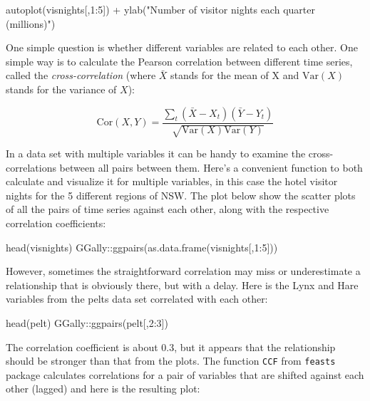 \documentclass[
  letterpaper,
  DIV=11,
  numbers=noendperiod]{scrreprt}
\newenvironment{Shaded}{\begin{snugshade}}{\end{snugshade}}
\newcommand{\NormalTok}[1]{\textcolor[rgb]{0.00,0.23,0.31}{#1}}
\begin{document}
\begin{Shaded}
\begin{Highlighting}[]
\NormalTok{autoplot(visnights[,1:5]) +}
\NormalTok{  ylab("Number of visitor nights each quarter (millions)")}
\end{Highlighting}
\end{Shaded}

One simple question is whether different variables are related to each
other. One simple way is to calculate the Pearson correlation between
different time series, called the \emph{cross-correlation} (where
\(\bar X\) stands for the mean of X and \(\text{Var}(X)\) stands for the
variance of \(X\)):

\[
\text{Cor}(X,Y) = \frac{\sum_t (\bar X - X_t)(\bar Y - Y_t)}{\sqrt{\text{Var}(X)\text{Var}(Y)}}
\]

In a data set with multiple variables it can be handy to examine the
cross-correlations between all pairs between them. Here's a convenient
function to both calculate and visualize it for multiple variables, in
this case the hotel visitor nights for the 5 different regions of NSW.
The plot below show the scatter plots of all the pairs of time series
against each other, along with the respective correlation coefficients:

\begin{Shaded}
\begin{Highlighting}[]
\NormalTok{head(visnights)}
\NormalTok{GGally::ggpairs(as.data.frame(visnights[,1:5]))}
\end{Highlighting}
\end{Shaded}

However, sometimes the straightforward correlation may miss or
underestimate a relationship that is obviously there, but with a delay.
Here is the Lynx and Hare variables from the pelts data set correlated
with each other:

\begin{Shaded}
\begin{Highlighting}[]
\NormalTok{head(pelt)}
\NormalTok{GGally::ggpairs(pelt[,2:3])}
\end{Highlighting}
\end{Shaded}

The correlation coefficient is about 0.3, but it appears that the
relationship should be stronger than that from the plots. The function
\texttt{CCF} from \texttt{feasts} package calculates correlations for a
pair of variables that are shifted against each other (lagged) and here
is the resulting plot:
\end{document}
